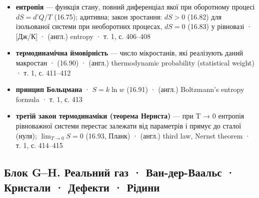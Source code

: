 \documentclass[11pt,a4paper,oneside]{book}
\newcommand{\book}{}
\begin{document}
\begin{itemize}
\item \textbf{ентропія} — функція стану, повний диференціал якої при оборотному процесі $dS = d\text{'}Q/T$ (16.75); адитивна; закон зростання: $dS > 0$ (16.82) для ізольованої системи при необоротних процесах, $dS = 0$ (16.83) у рівновазі · [Дж/К] · (англ.) entropy · \book{} т. 1, с. 406–408
\item \textbf{термодинамічна ймовірність} — число мікростанів, які реалізують даний макростан · (16.90) · (англ.) thermodynamic probability (statistical weight) · \book{} т. 1, с. 411–412
\item \textbf{принцип Больцмана} · $S = k\ln w$ (16.91) · (англ.) Boltzmann's entropy formula · \book{} т. 1, с. 413
\item \textbf{третій закон термодинаміки (теорема Нернста)} — при T → 0 ентропія рівноважної системи перестає залежати від параметрів і прямує до сталої (нуля); $\lim_{T\to0}S = 0$ (16.93, Планк) · (англ.) third law, Nernst theorem · \book{} т. 1, с. 414–415
\end{itemize}

\subsection*{Блок G–H. Реальний газ · Ван-дер-Ваальс · Кристали · Дефекти · Рідини}
\end{document}

